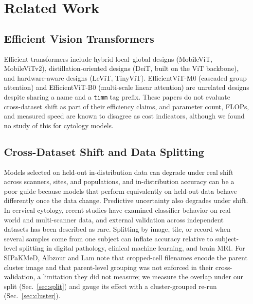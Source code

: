 \documentclass[12pt,letterpaper]{article}
\begin{document}
\section{Related Work}
\label{sec:related}

\subsection{Efficient Vision Transformers}
Efficient transformers include hybrid local--global designs (MobileViT\cite{mehta2022mobilevit}, MobileViTv2\cite{mehta2022mobilevitv2}), distillation-oriented designs (DeiT\cite{touvron2021deit}, built on the ViT backbone\cite{dosovitskiy2021vit}), and hardware-aware designs (LeViT\cite{graham2021levit}, TinyViT\cite{wu2022tinyvit}). EfficientViT-M0 (cascaded group attention\cite{liu2023efficientvit}) and EfficientViT-B0 (multi-scale linear attention\cite{cai2023efficientvit}) are unrelated designs despite sharing a name and a \texttt{timm} tag prefix. These papers do not evaluate cross-dataset shift as part of their efficiency claims, and parameter count, FLOPs, and measured speed are known to disagree as cost indicators,\cite{dehghani2022,mehta2022mobilevit,vasu2023mobileone} although we found no study of this for cytology models.

\subsection{Cross-Dataset Shift and Data Splitting}
Models selected on held-out in-distribution data can degrade under real shift across scanners, sites, and populations,\cite{zech2018,guan2022} and in-distribution accuracy can be a poor guide because models that perform equivalently on held-out data behave differently once the data change.\cite{koh2021,geirhos2020,damour2020} Predictive uncertainty also degrades under shift.\cite{ovadia2019} In cervical cytology, recent studies have examined classifier behavior on real-world and multi-scanner data,\cite{ferreira2026,coskun2026} and external validation across independent datasets has been described as rare.\cite{albzour2026hybrid} Splitting by image, tile, or record when several samples come from one subject can inflate accuracy relative to subject-level splitting in digital pathology,\cite{bussola2021} clinical machine learning,\cite{saeb2017} and brain MRI.\cite{rumala2023} For SIPaKMeD, Albzour and Lam note that cropped-cell filenames encode the parent cluster image and that parent-level grouping was not enforced in their cross-validation, a limitation they did not measure;\cite{albzour2026hybrid} we measure the overlap under our split (Sec.~\ref{sec:split}) and gauge its effect with a cluster-grouped re-run (Sec.~\ref{sec:cluster}).
\end{document}
